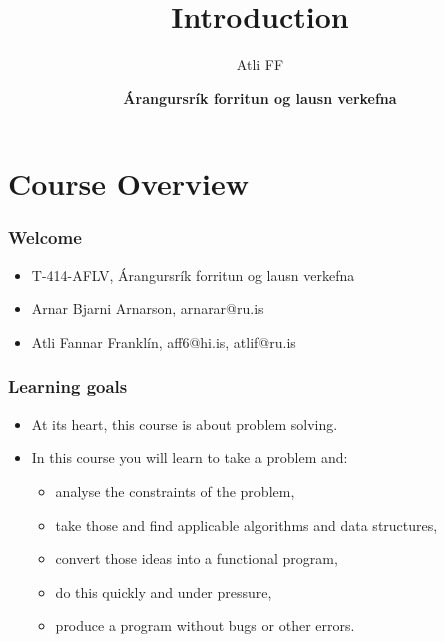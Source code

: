 \documentclass{beamer}
\title{Introduction}
\author{Atli FF}
\institute{\href{http://ru.is/td}{School of Computer Science} \\[2pt] \href{http://ru.is}{Reykjavík University}}
\date{\textbf{Árangursrík forritun og lausn verkefna}}
\begin{document}
\begin{frame}[plain]
    \titlepage
\end{frame}

\section*{Course Overview}

\begin{frame}[plain]
	\frametitle{Welcome}
	\begin{itemize}
		 \item T-414-AFLV, Árangursrík forritun og lausn verkefna
         \vspace{10pt}
         \item Arnar Bjarni Arnarson, {\alert{arnarar@ru.is}}
         \item Atli Fannar Franklín, {\alert{aff6@hi.is}, \alert{atlif@ru.is}}
	\end{itemize}
\end{frame}

\begin{frame}[plain]
	\frametitle{Learning goals}
	\begin{itemize}
		 \item At its heart, this course is about problem solving.
		 \item In this course you will learn to take a problem and:
		 \begin{itemize}
		 	\item analyse the constraints of the problem,
		 	\item take those and find applicable algorithms and data structures,
		 	\item convert those ideas into a functional program,
		 	\item do this quickly and under pressure,
		 	\item produce a program without bugs or other errors.
		 \end{itemize}
	\end{itemize}
\end{frame}
\end{document}
